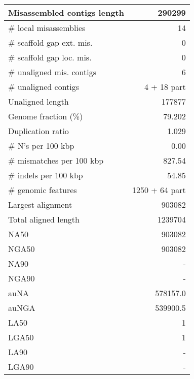 \documentclass[12pt,a4paper]{article}
\begin{document}
\begin{table}[ht]
\begin{center}
\begin{tabular}{|l*{1}{|r}|}
Misassembled contigs length & 290299 \\ \hline
\# local misassemblies & 14 \\ \hline
\# scaffold gap ext. mis. & 0 \\ \hline
\# scaffold gap loc. mis. & 0 \\ \hline
\# unaligned mis. contigs & 6 \\ \hline
\# unaligned contigs & 4 + 18 part \\ \hline
Unaligned length & 177877 \\ \hline
Genome fraction (\%) & 79.202 \\ \hline
Duplication ratio & 1.029 \\ \hline
\# N's per 100 kbp & 0.00 \\ \hline
\# mismatches per 100 kbp & 827.54 \\ \hline
\# indels per 100 kbp & 54.85 \\ \hline
\# genomic features & 1250 + 64 part \\ \hline
Largest alignment & 903082 \\ \hline
Total aligned length & 1239704 \\ \hline
NA50 & 903082 \\ \hline
NGA50 & 903082 \\ \hline
NA90 & - \\ \hline
NGA90 & - \\ \hline
auNA & 578157.0 \\ \hline
auNGA & 539900.5 \\ \hline
LA50 & 1 \\ \hline
LGA50 & 1 \\ \hline
LA90 & - \\ \hline
LGA90 & - \\ \hline
\end{tabular}
\end{center}
\end{table}
\end{document}
